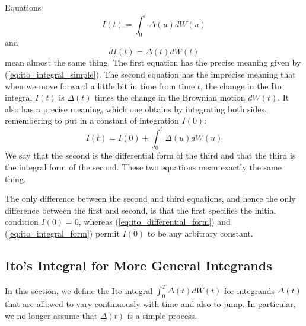 \documentclass[\topdir/lecture\_notes.tex]{subfiles}
\begin{document}
\begin{remark}\label{rmk:differential_integral_forms}
Equations
\begin{equation}
I(t)=\int_{0}^{t} \Delta(u) d W(u)
\end{equation}
and
\begin{equation}
d I(t)=\Delta(t) d W(t) \label{eq:ito_differential_form}
\end{equation}
mean almost the same thing. The first equation has the precise meaning given by (\ref{eq:ito_integral_simple}). The second equation has the imprecise meaning that when we move forward a little bit in time from time \(t\), the change in the Ito integral \(I(t)\) is \(\Delta(t)\) times the change in the Brownian motion \(dW(t)\). It also has a precise meaning, which one obtains by integrating both sides, remembering to put in a constant of integration \(I(0)\):
\begin{equation}
I(t)=I(0)+\int_{0}^{t} \Delta(u) dW(u) \label{eq:ito_integral_form}
\end{equation}
We say that the second is the differential form of the third and that the third is the integral form of the second. These two equations mean exactly the same thing.

The only difference between the second and third equations, and hence the only difference between the first and second, is that the first specifies the initial condition \(I(0)=0\), whereas (\ref{eq:ito_differential_form}) and (\ref{eq:ito_integral_form}) permit \(I(0)\) to be any arbitrary constant.
\end{remark}

\subsection{Ito's Integral for More General Integrands}
In this section, we define the Ito integral \(\int_{0}^{T} \Delta(t) d W(t)\) for integrands \(\Delta(t)\) that are allowed to vary continuously with time and also to jump. In particular, we no longer assume that \(\Delta(t)\) is a simple process.
\end{document}
